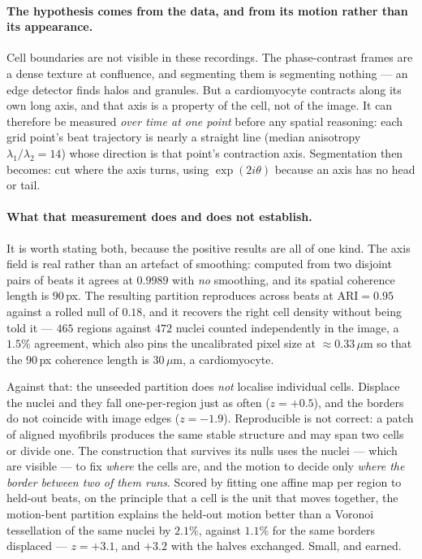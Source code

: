 \documentclass[11pt]{article}
\begin{document}
\paragraph{The hypothesis comes from the data, and from its motion rather than its appearance.}
Cell boundaries are not visible in these recordings. The phase-contrast frames are a dense texture
at confluence, and segmenting them is segmenting nothing --- an edge detector finds halos and
granules. But a cardiomyocyte contracts along its own long axis, and that axis is a property of the
cell, not of the image. It can therefore be measured \emph{over time at one point} before any
spatial reasoning: each grid point's beat trajectory is nearly a straight line (median anisotropy
$\lambda_1/\lambda_2 = 14$) whose direction is that point's contraction axis. Segmentation then
becomes: cut where the axis turns, using $\exp(2i\theta)$ because an axis has no head or tail.

\paragraph{What that measurement does and does not establish.} It is worth stating both, because
the positive results are all of one kind. The axis field is real rather than an artefact of
smoothing: computed from two disjoint pairs of beats it agrees at $0.9989$ with \emph{no} smoothing,
and its spatial coherence length is $90$\,px. The resulting partition reproduces across beats at
$\mathrm{ARI} = 0.95$ against a rolled null of $0.18$, and it recovers the right cell density
without being told it --- $465$ regions against $472$ nuclei counted independently in the image, a
$1.5\%$ agreement, which also pins the uncalibrated pixel size at $\approx 0.33\,\mu$m so that the
$90$\,px coherence length is $30\,\mu$m, a cardiomyocyte.

Against that: the unseeded partition does \emph{not} localise individual cells. Displace the nuclei
and they fall one-per-region just as often ($z = +0.5$), and the borders do not coincide with image
edges ($z = -1.9$). Reproducible is not correct: a patch of aligned myofibrils produces the same
stable structure and may span two cells or divide one. The construction that survives its nulls
uses the nuclei --- which are visible --- to fix \emph{where} the cells are, and the motion to
decide only \emph{where the border between two of them runs}. Scored by fitting one affine map per
region to held-out beats, on the principle that a cell is the unit that moves together, the
motion-bent partition explains the held-out motion better than a Voronoi tessellation of the same
nuclei by $2.1\%$, against $1.1\%$ for the same borders displaced --- $z = +3.1$, and $+3.2$ with
the halves exchanged. Small, and earned.
\end{document}
